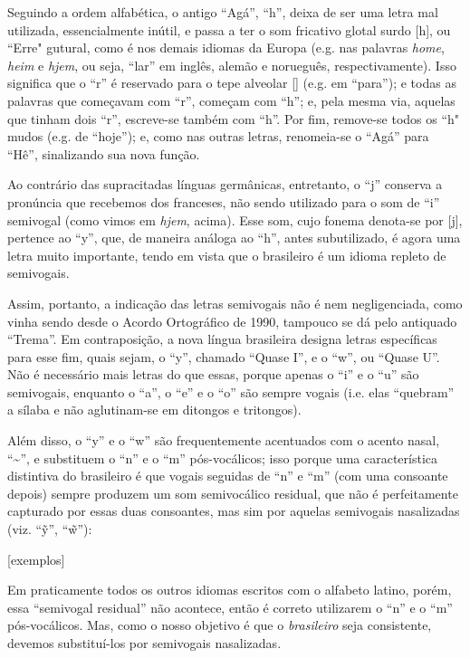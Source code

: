 \documentclass[12pt, a4paper]{article}
\begin{document}
\begin{bilingualpages}
    Seguindo a ordem alfabética, o antigo ``Agá'', ``h'', deixa de ser uma letra mal utilizada, essencialmente inútil, e passa a ter o som fricativo glotal surdo [h], ou ``Erre" gutural, como é nos demais idiomas da Europa (e.g. nas palavras \textit{home}, \textit{heim} e \textit{hjem}, ou seja, ``lar'' em inglês, alemão e norueguês, respectivamente). Isso significa que o ``r'' é reservado para o tepe alveolar [\textfishhookr] (e.g. em ``para''); e todas as palavras que começavam com ``r'', começam com ``h''; e, pela mesma via, aquelas que tinham dois ``r'', escreve-se também com ``h''. Por fim, remove-se todos os ``h" mudos (e.g. de ``hoje''); e, como nas outras letras, renomeia-se o ``Agá'' para ``Hê'', sinalizando sua nova função.

    Ao contrário das supracitadas línguas germânicas, entretanto, o ``j'' conserva a pronúncia que recebemos dos franceses, não sendo utilizado para o som de ``i'' semivogal (como vimos em \textit{hjem}, acima). Esse som, cujo fonema denota-se por [j], pertence ao ``y'', que, de maneira análoga ao ``h'', antes subutilizado, é agora uma letra muito importante, tendo em vista que o brasileiro é um idioma repleto de semivogais.
    
    Assim, portanto, a indicação das letras semivogais não é nem negligenciada, como vinha sendo desde o Acordo Ortográfico de 1990, tampouco se dá pelo antiquado ``Trema''. Em contraposição, a nova língua brasileira designa letras específicas para esse fim, quais sejam, o ``y'', chamado ``Quase I'', e o ``w'', ou ``Quase U''. Não é necessário mais letras do que essas, porque apenas o ``i'' e o ``u'' são semivogais, enquanto o ``a'', o ``e'' e o ``o'' são sempre vogais (i.e. elas ``quebram'' a sílaba e não aglutinam-se em ditongos e tritongos).
    
    Além disso, o ``y'' e o ``w'' são frequentemente acentuados com o acento nasal, ``\textasciitilde'', e substituem o ``n'' e o ``m'' pós-vocálicos; isso porque uma característica distintiva do brasileiro é que vogais seguidas de ``n'' e ``m'' (com uma consoante depois) sempre produzem um som semivocálico residual, que não é perfeitamente capturado por essas duas consoantes, mas sim por aquelas semivogais nasalizadas (viz. ``\~y'', ``\~w''):

    [exemplos]

    Em praticamente todos os outros idiomas escritos com o alfabeto latino, porém, essa ``semivogal residual'' não acontece, então é correto utilizarem o ``n'' e o ``m'' pós-vocálicos. Mas, como o nosso objetivo é que o \textit{brasileiro} seja consistente, devemos substituí-los por semivogais nasalizadas.


\end{bilingualpages}
\end{document}

